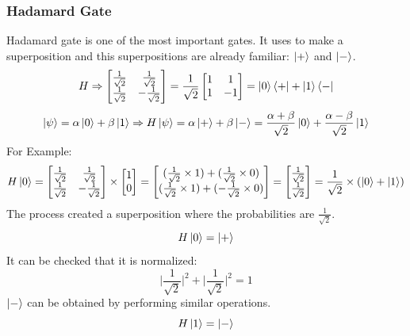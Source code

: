 \documentclass{article}
\begin{document}
\subsubsection{Hadamard Gate}
Hadamard gate is one of the most important gates. It uses to make a superposition and this superpositions are already familiar: $\ket{+}$ and $\ket{-}$.
\begin{equation*}
    H \Rightarrow \begin{bmatrix} \frac{1}{\sqrt{2}} & \frac{1}{\sqrt{2}} \\ \frac{1}{\sqrt{2}} & -\frac{1}{\sqrt{2}} \end{bmatrix} = \frac{1}{\sqrt{2}}\begin{bmatrix} 1 & 1 \\ 1 & -1 \end{bmatrix} = \ket{0}\bra{+} + \ket{1}\bra{-}
\end{equation*}
\begin{equation*}
      \ket{\psi} = \alpha\ket{0} + \beta\ket{1} \Rightarrow H\ket{\psi} = \alpha\ket{+} + \beta\ket{-} = \frac{\alpha + \beta}{\sqrt{2}}\ket{0} + \frac{\alpha - \beta}{\sqrt{2}}\ket{1}
\end{equation*}
For Example:
\begin{equation*}
    H\ket{0} = \begin{bmatrix} \frac{1}{\sqrt{2}} & \frac{1}{\sqrt{2}} \\ \frac{1}{\sqrt{2}} & -\frac{1}{\sqrt{2}} \end{bmatrix} \times \begin{bmatrix}1 \\ 0\end{bmatrix} = \begin{bmatrix}(\frac{1}{\sqrt{2}} \times 1) + (\frac{1}{\sqrt{2}} \times 0) \\ (\frac{1}{\sqrt{2}} \times 1) + (-\frac{1}{\sqrt{2}} \times 0)\end{bmatrix} = \begin{bmatrix}\frac{1}{\sqrt{2}} \\ \frac{1}{\sqrt{2}}\end{bmatrix} = \frac{1}{\sqrt{2}} \times (\ket{0} + \ket{1})
\end{equation*}
The process created a superposition where the probabilities are $\frac{1}{\sqrt{2}}$.
$$H\ket{0} = \ket{+}$$
It can be checked that it is normalized:
\begin{equation*}
    \lvert \frac{1}{\sqrt{2}} \rvert^2 + \lvert \frac{1}{\sqrt{2}} \rvert^2 = 1
\end{equation*}
$\ket{-}$ can be obtained by performing similar operations.
\begin{equation*}
H\ket{1} = \ket{-}
\end{equation*}
\vspace{2cm}
\end{document}
